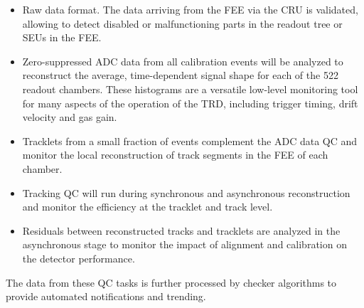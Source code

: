 \begin{itemize}

    \item Raw data format. The data arriving from the FEE via the CRU is validated, allowing to detect disabled or malfunctioning parts in the readout tree or SEUs in the FEE. 
    
    \item Zero-suppressed ADC data from all calibration events will be analyzed to reconstruct the average, time-dependent signal shape for each of the 522 readout chambers. These histograms are a versatile low-level monitoring tool for many aspects of the operation of the TRD, including trigger timing, drift velocity and gas gain.
    
    \item Tracklets from a small fraction of events complement the ADC data QC and monitor the local reconstruction of track segments in the FEE of each chamber.
    
    \item Tracking QC will run during synchronous and asynchronous reconstruction and monitor the efficiency at the tracklet and track level.
    
    \item Residuals between reconstructed tracks and tracklets are analyzed in the asynchronous stage to monitor the impact of alignment and calibration on the detector performance.
\end{itemize}

The data from these QC tasks is further processed by checker algorithms to provide automated notifications and trending. 

